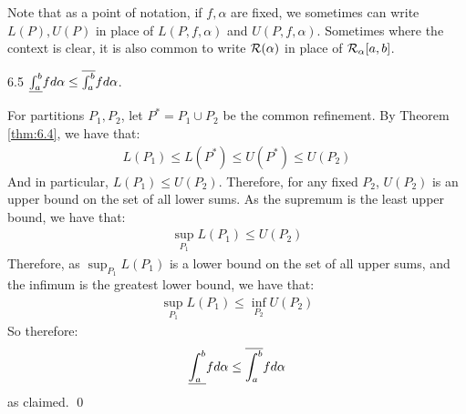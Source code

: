 \newpage 
Note that as a point of notation, if $f, \alpha$ are fixed, we sometimes can write $L(P), U(P)$ in place of $L(P, f, \alpha)$ and $U(P, f, \alpha)$. Sometimes where the context is clear, it is also common to write $\mathcal{R}(\alpha)$ in place of $\mathcal{R}_\alpha[a, b]$. 

\begin{theorem}{}{6.5}
    $\underline{\int_{a}^{b}} f d\alpha \leq \overline{\int_{a}^{b}} f d\alpha$.
\end{theorem}
\begin{nproof}
    For partitions $P_1, P_2$, let $P^* = P_1 \cup P_2$ be the common refinement. By Theorem \ref{thm:6.4}, we have that:
    \begin{align*}
        L(P_1) \leq L(P^*) \leq U(P^*) \leq U(P_2)
    \end{align*}
    And in particular, $L(P_1) \leq U(P_2)$. Therefore, for any fixed $P_2$, $U(P_2)$ is an upper bound on the set of all lower sums. As the supremum is the least upper bound, we have that:
    \begin{align*}
        \sup_{P_1} L(P_1) \leq U(P_2)
    \end{align*}
    Therefore, as $\sup_{P_1} L(P_1)$ is a lower bound on the set of all upper sums, and the infimum is the greatest lower bound, we have that:
    \begin{align*}
        \sup_{P_1} L(P_1) \leq \inf_{P_2} U(P_2)
    \end{align*}
    So therefore:
    \begin{align*}
        \underline{\int_{a}^{b}} f d\alpha \leq \overline{\int_{a}^{b}} f d\alpha
    \end{align*}
    as claimed. \qed
\end{nproof}

